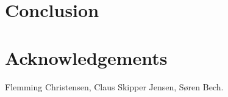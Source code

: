 

\section{Conclusion}

\section*{Acknowledgements}
Flemming Christensen, Claus Skipper Jensen, Søren Bech. 
